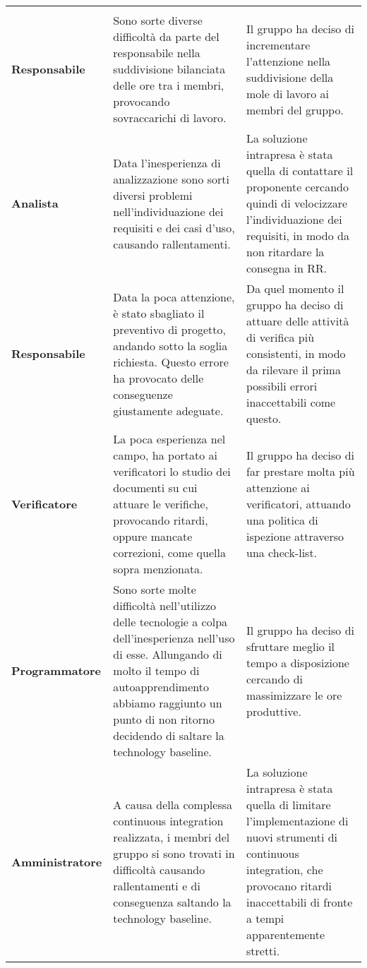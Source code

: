\documentclass[../piano-di-qualifica.tex]{subfiles}
\begin{document}
  \begin{longtable}[H]{>{\centering\bfseries}m{4cm} >{\centering\arraybackslash}m{6cm} >{\centering\arraybackslash}m{6cm}}
    \rowcolor{darkgray!90!}
    \color{white}{\textbf{Ruolo}} & \color{white}{\textbf{Problema}} & \color{white}{\textbf{Soluzione}} \\
    Responsabile & Sono sorte diverse difficoltà da parte del responsabile nella suddivisione bilanciata delle ore tra i membri, provocando sovraccarichi di lavoro. & Il gruppo ha deciso di incrementare l'attenzione nella suddivisione della mole di lavoro ai membri del gruppo. \\
    Analista & Data l'inesperienza di analizzazione sono sorti diversi problemi nell'individuazione dei requisiti e dei casi d'uso, causando rallentamenti. & La soluzione intrapresa è stata quella di contattare il proponente cercando quindi di velocizzare l'individuazione dei requisiti, in modo da non ritardare la consegna in RR. \\
    Responsabile & Data la poca attenzione, è stato sbagliato il preventivo di progetto, andando sotto la soglia richiesta. Questo errore ha provocato delle conseguenze giustamente adeguate. & Da quel momento il gruppo ha deciso di attuare delle attività di verifica più consistenti, in modo da rilevare il prima possibili errori inaccettabili come questo. \\
    Verificatore & La poca esperienza nel campo, ha portato ai verificatori lo studio dei documenti su cui attuare le verifiche, provocando ritardi, oppure mancate correzioni, come quella sopra menzionata. & Il gruppo ha deciso di far prestare molta più attenzione ai verificatori, attuando una politica di ispezione attraverso una check-list. \\
    Programmatore & Sono sorte molte difficoltà nell'utilizzo delle tecnologie a colpa dell'inesperienza nell'uso di esse. Allungando di molto il tempo di autoapprendimento abbiamo raggiunto un punto di non ritorno decidendo di saltare la technology baseline. & Il gruppo ha deciso di sfruttare meglio il tempo a disposizione cercando di massimizzare le ore produttive. \\
    Amministratore & A causa della complessa continuous integration realizzata, i membri del gruppo si sono trovati in difficoltà causando rallentamenti e di conseguenza saltando la technology baseline. & La soluzione intrapresa è stata quella di limitare l'implementazione di nuovi strumenti di continuous integration, che provocano ritardi inaccettabili di fronte a tempi apparentemente stretti. \\
  \end{longtable}
\end{document}

